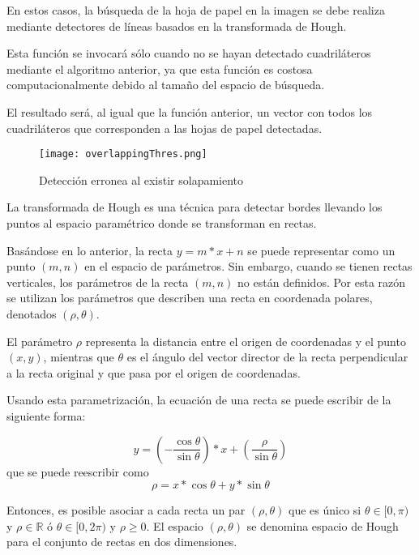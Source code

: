 En estos casos, la búsqueda de la hoja de papel en la imagen se debe realiza mediante detectores de líneas basados en la transformada de Hough.

Esta función se invocará sólo cuando no se hayan detectado cuadriláteros mediante el algoritmo anterior, ya que esta función es costosa computacionalmente debido al tamaño del espacio de búsqueda. 

El resultado será, al igual que la función anterior, un vector con todos los cuadriláteros que corresponden a las hojas de papel detectadas.

\begin{figure}[h!] 
  \centering
  \texttt{[image: overlappingThres.png]}
  \caption{Detección erronea al existir solapamiento}
  \label{fig:overlappingThres}
\end{figure}

La transformada de Hough es una técnica para detectar bordes llevando los puntos al espacio paramétrico donde se transforman en rectas.

Basándose en lo anterior, la recta $y = m*x+n$ se puede representar como un punto $(m,n)$ en el espacio de parámetros. Sin embargo, cuando se tienen rectas verticales, los parámetros de la recta $(m,n)$  no están definidos. Por esta razón se utilizan los parámetros que describen una recta en coordenada polares, denotados $(\rho,\theta)$. 

El parámetro $\rho$ representa la distancia entre el origen de coordenadas y el punto$(x,y)$, mientras que $\theta$ es el ángulo del vector director de la recta perpendicular a la recta original y que pasa por el origen de coordenadas.

Usando esta parametrización, la ecuación de una recta se puede escribir de la siguiente forma:

\begin{equation}
y=(-\dfrac{\cos \theta}{\sin \theta}) * x + (\dfrac{\rho}{\sin \theta})
\end{equation}
que se puede reescribir como
\begin{equation}
\rho=x * \cos \theta + y * \sin \theta
\end{equation}

Entonces, es posible asociar a cada recta un par $(\rho,\theta)$ que es único si $\theta \in [0,\pi)$ y $\rho \in \mathbb{R}$ ó $\theta \in [0,2\pi)$ y $\rho \geq 0$. El espacio $(\rho,\theta)$ se denomina espacio de Hough para el conjunto de rectas en dos dimensiones.

